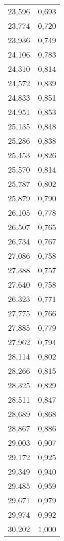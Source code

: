 \begin{longtable}{c c}
	23,596&0,693 \\
	23,774&0,720 \\
	23,936&0,749 \\
	24,106&0,783 \\
	24,310&0,814 \\
	24,572&0,839 \\
	24,833&0,851 \\
	24,951&0,853 \\
	25,135&0,848 \\
	25,286&0,838 \\
	25,453&0,826 \\
	25,570&0,814 \\
	25,787&0,802 \\
	25,879&0,790 \\
	26,105&0,778 \\
	26,507&0,765 \\
	26,734&0,767 \\
	27,086&0,758 \\
	27,388&0,757 \\
	27,640&0,758 \\
	26,323&0,771 \\
	27,775&0,766 \\
	27,885&0,779 \\
	27,962&0,794 \\
	28,114&0,802 \\
	28,266&0,815 \\
	28,325&0,829 \\
	28,511&0,847 \\
	28,689&0,868 \\
	28,867&0,886 \\
	29,003&0,907 \\
	29,172&0,925 \\
	29,349&0,940 \\
	29,485&0,959 \\
	29,671&0,979 \\
	29,974&0,992 \\
	30,202&1,000 \\
\end{longtable}
